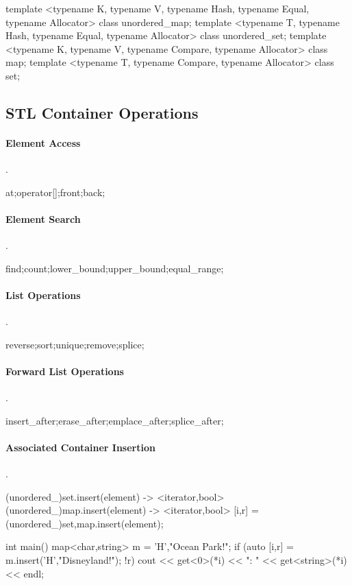 \begin{code}
template <typename K, typename V,
          typename Hash, typename Equal,
          typename Allocator>
class unordered_map;
template <typename T,
          typename Hash, typename Equal,
          typename Allocator>
class unordered_set;
template <typename K, typename V,
          typename Compare,
          typename Allocator>
class map;
template <typename T,
          typename Compare,
          typename Allocator>
class set;
\end{code}

\subsection*{STL Container Operations}
\paragraph{Element Access}{.}
\begin{code}
at;operator[];front;back;
\end{code}

\paragraph{Element Search}{.}
\begin{code}
find;count;lower_bound;upper_bound;equal_range;
\end{code}

\paragraph{List Operations}{.}
\begin{code}
reverse;sort;unique;remove;splice;
\end{code}

\paragraph{Forward List Operations}{.}
\begin{code}
insert_after;erase_after;emplace_after;splice_after;
\end{code}

\paragraph{Associated Container Insertion}{.}
\begin{code}
(unordered_)set.insert(element) -> <iterator,bool>
(unordered_)map.insert(element) -> <iterator,bool>
[i,r] = (unordered_){set,map}.insert(element);

int main()
{
  map<char,string> m = {{'H',"Ocean Park!"}};
  if (auto [i,r] = m.insert({'H',"Disneyland!"}); !r) {
    cout << get<0>(*i) << ": " << get<string>(*i) << endl;
  }
}

\end{code}

